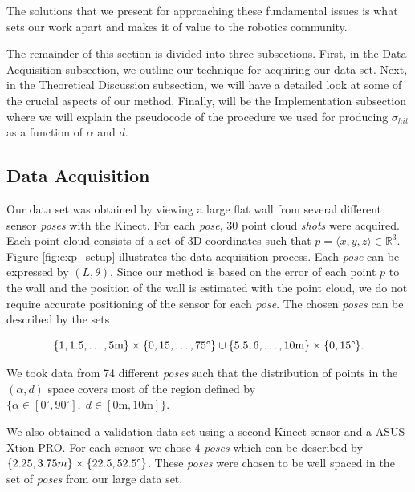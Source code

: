 \noindent The solutions that we present for approaching these fundamental issues is what sets our work apart and makes it of value to the robotics community. 

The remainder of this section is divided into three subsections. First, in the Data Acquisition subsection, we outline our technique for acquiring our data set. Next, in the Theoretical Discussion subsection, we will have a detailed look at some of the crucial aspects of our method. Finally, will be the Implementation subsection where we will explain the pseudocode of the procedure we used for producing $\sigma_{hit}$ as a function of $\alpha$ and $d$.

\subsection{Data Acquisition} %

Our data set was obtained by viewing a large flat wall from several different
sensor \emph{poses} with the Kinect. For each \emph{pose}, 30 point cloud
\emph{shots} were acquired. Each point cloud consists of a set of 3D coordinates such that $p=\langle x,y,z \rangle \in \mathbb{R}^3$. Figure \ref{fig:exp_setup} illustrates the data acquisition process. Each \emph{pose}
can be expressed by $(L,\theta)$. Since our method is based on the error of each point $p$ to the wall and the position of the wall is estimated with the point cloud, we do not require accurate positioning of the sensor for each \emph{pose}. The chosen \emph{poses} can be described by the sets 

{\small \setlength\abovedisplayskip{-4pt} \setlength\belowdisplayskip{6pt} %
\begin{equation*}
\{1,1.5,\dots,5\text{m}\}\times\{0,15,\dots,75\text{\textdegree}\} \cup \{5.5,6,\dots,10\text{m}\}\times\{0,15\text{\textdegree}\}.
\end{equation*}
}%

\noindent We took data from 74 different \emph{poses} such that the distribution of points in the $(\alpha,d)$ space covers most of the region defined by $\{\alpha \in [0^\circ, 90^\circ], \; d \in [0\text{m}, 10\text{m}] \}$.

We also obtained a validation data set using a second Kinect sensor and a ASUS Xtion PRO. For each sensor we chose 4 \emph{poses} which can be described by $\{2.25,3.75m\}\times\{22.5,52.5\text{\textdegree}\}$. These \emph{poses} were chosen to be well spaced in the set of \emph{poses} from our large data set.  

